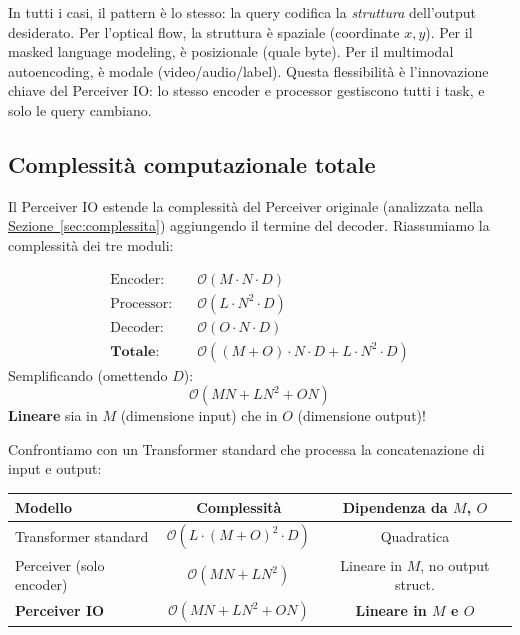 \documentclass[12pt,a4paper]{article}
\begin{document}
In tutti i casi, il pattern \`e lo stesso: la query codifica la \emph{struttura} dell'output desiderato. Per l'optical flow, la struttura \`e spaziale (coordinate $x, y$). Per il masked language modeling, \`e posizionale (quale byte). Per il multimodal autoencoding, \`e modale (video/audio/label). Questa flessibilit\`a \`e l'innovazione chiave del Perceiver IO: lo stesso encoder e processor gestiscono tutti i task, e solo le query cambiano.

\subsection{Complessit\`a computazionale totale}

Il Perceiver IO estende la complessit\`a del Perceiver originale (analizzata nella \hyperref[sec:complessita]{Sezione~\ref*{sec:complessita}}) aggiungendo il termine del decoder. Riassumiamo la complessit\`a dei tre moduli:

\begin{formulabox}
\begin{align}
    \text{Encoder:} \quad & \mathcal{O}(M \cdot N \cdot D) \\
    \text{Processor:} \quad & \mathcal{O}(L \cdot N^2 \cdot D) \\
    \text{Decoder:} \quad & \mathcal{O}(O \cdot N \cdot D) \\[6pt]
    \textbf{Totale:} \quad & \mathcal{O}\!\left((M + O) \cdot N \cdot D + L \cdot N^2 \cdot D\right)
\end{align}
Semplificando (omettendo $D$):
\[
\boxed{\mathcal{O}\!\left(MN + LN^2 + ON\right)}
\]
\textbf{Lineare} sia in $M$ (dimensione input) che in $O$ (dimensione output)!
\end{formulabox}

Confrontiamo con un Transformer standard che processa la concatenazione di input e output:

\begin{center}
\begin{tabular}{lcc}
\toprule
\textbf{Modello} & \textbf{Complessit\`a} & \textbf{Dipendenza da $M$, $O$} \\
\midrule
Transformer standard & $\mathcal{O}\!\left(L \cdot (M+O)^2 \cdot D\right)$ & Quadratica \\
Perceiver (solo encoder) & $\mathcal{O}\!\left(MN + LN^2\right)$ & Lineare in $M$, no output struct. \\
\textbf{Perceiver IO} & $\mathcal{O}\!\left(MN + LN^2 + ON\right)$ & \textbf{Lineare in $M$ e $O$} \\
\bottomrule
\end{tabular}
\end{center}
\end{document}
